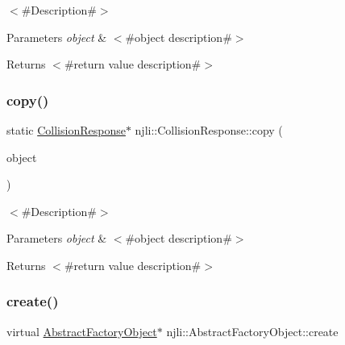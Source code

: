 $<$\#\+Description\#$>$


\begin{DoxyParams}{Parameters}
{\em object} & $<$\#object description\#$>$\\
\hline
\end{DoxyParams}
\begin{DoxyReturn}{Returns}
$<$\#return value description\#$>$ 
\end{DoxyReturn}
\mbox{\label{classnjli_1_1_collision_response_a86fa2b8ab53032b1d174cec2b95dbddf}} 
\subsubsection{\texorpdfstring{copy()}{copy()}}
{\footnotesize\ttfamily static \mbox{\hyperlink{classnjli_1_1_collision_response}{Collision\+Response}}$\ast$ njli\+::\+Collision\+Response\+::copy (\begin{DoxyParamCaption}\item[{const \mbox{\hyperlink{classnjli_1_1_collision_response}{Collision\+Response}} \&}]{object }\end{DoxyParamCaption})\hspace{0.3cm}{\ttfamily [static]}}

$<$\#\+Description\#$>$


\begin{DoxyParams}{Parameters}
{\em object} & $<$\#object description\#$>$\\
\hline
\end{DoxyParams}
\begin{DoxyReturn}{Returns}
$<$\#return value description\#$>$ 
\end{DoxyReturn}
\mbox{\label{classnjli_1_1_collision_response_a83a8876ae63b92804004cf3febe76573}} 
\subsubsection{\texorpdfstring{create()}{create()}\hspace{0.1cm}{\footnotesize\ttfamily [1/3]}}
{\footnotesize\ttfamily virtual \mbox{\hyperlink{classnjli_1_1_abstract_factory_object}{Abstract\+Factory\+Object}}$\ast$ njli\+::\+Abstract\+Factory\+Object\+::create}

